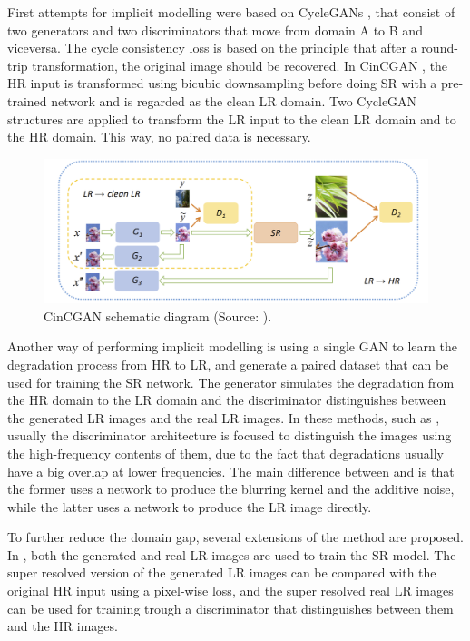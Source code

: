         First attempts for implicit modelling were based on CycleGANs \cite{CycleGAN2017}, that consist of two generators and two discriminators that move from domain A to B and viceversa. 
        The cycle consistency loss is based on the principle that after a round-trip transformation, the original image should be recovered.
        In CinCGAN \cite{yuan2018unsupervised}, the HR input is transformed using bicubic downsampling before doing SR with a pre-trained network and is regarded as the clean LR domain.
        Two CycleGAN structures are applied to transform the LR input to the clean LR domain and to the HR domain. 
        This way, no paired data is necessary.

        \begin{figure}[H]
            \centering
            \includegraphics[width=\textwidth]{Includes/4-ccingan.png}
            \caption{CinCGAN schematic diagram (Source: \cite{yuan2018unsupervised}).}    
            \label{fig:2-CinCGAN}
        \end{figure}

        Another way of performing implicit modelling is using a single GAN to learn the degradation process from HR to LR, and generate a  paired dataset that can be used for training the SR network.
        The generator simulates the degradation from the HR domain to the LR domain and the discriminator distinguishes between the generated LR images and the real LR images.
        In these methods, such as \cite{luo2022learning,bulat2018learn}, usually the discriminator architecture is focused to distinguish the images using the high-frequency contents of them, due to the fact that degradations usually have a big overlap at lower frequencies. The main difference between \cite{luo2022learning} and \cite{bulat2018learn} is that the former uses a network to produce the blurring kernel and the additive noise, while the latter uses a network to produce the LR image directly.
        
        To further reduce the domain gap, several extensions of the method are proposed. 
        In \cite{wei2020unsupervised}, both the generated and real LR images are used to train the SR model.
        The super resolved version of the generated LR images can be compared with the original HR input using a pixel-wise loss, and the super resolved real LR images can be used for training trough a discriminator that distinguishes between them and the HR images.

